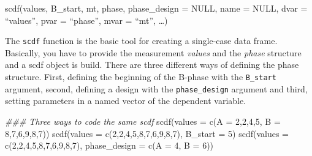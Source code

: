 \documentclass[
  letterpaper,
  DIV=11,
  numbers=noendperiod]{scrreprt}
\newenvironment{Shaded}{\begin{snugshade}}{\end{snugshade}}
\newcommand{\AttributeTok}[1]{\textcolor[rgb]{0.40,0.45,0.13}{#1}}
\newcommand{\DecValTok}[1]{\textcolor[rgb]{0.68,0.00,0.00}{#1}}
\newcommand{\DocumentationTok}[1]{\textcolor[rgb]{0.37,0.37,0.37}{\textit{#1}}}
\newcommand{\FunctionTok}[1]{\textcolor[rgb]{0.28,0.35,0.67}{#1}}
\newcommand{\NormalTok}[1]{\textcolor[rgb]{0.00,0.23,0.31}{#1}}
\begin{document}
\begin{tcolorbox}[enhanced jigsaw, toprule=.15mm, colframe=quarto-callout-tip-color-frame, left=2mm, colback=white, breakable, bottomrule=.15mm, arc=.35mm, rightrule=.15mm, leftrule=.75mm, opacityback=0]
\begin{minipage}[t]{5.5mm}
\textcolor{quarto-callout-tip-color}{\faLightbulb}
\end{minipage}%
\begin{minipage}[t]{\textwidth - 5.5mm}
scdf(values, B\_start, mt, phase, phase\_design = NULL, name = NULL,
dvar = ``values'', pvar = ``phase'', mvar = ``mt'',
\ldots)\end{minipage}%
\end{tcolorbox}

The \texttt{scdf} function is the basic tool for creating a single-case
data frame. Basically, you have to provide the measurement \emph{values}
and the \emph{phase} structure and a scdf object is build. There are
three different ways of defining the phase structure. First, defining
the beginning of the B-phase with the \texttt{B\_start} argument,
second, defining a design with the \texttt{phase\_design} argument and
third, setting parameters in a named vector of the dependent variable.

\begin{Shaded}
\begin{Highlighting}[]
\DocumentationTok{\#\#\# Three ways to code the same scdf}
\FunctionTok{scdf}\NormalTok{(}\AttributeTok{values =} \FunctionTok{c}\NormalTok{(}\AttributeTok{A =} \DecValTok{2}\NormalTok{,}\DecValTok{2}\NormalTok{,}\DecValTok{4}\NormalTok{,}\DecValTok{5}\NormalTok{, }\AttributeTok{B =} \DecValTok{8}\NormalTok{,}\DecValTok{7}\NormalTok{,}\DecValTok{6}\NormalTok{,}\DecValTok{9}\NormalTok{,}\DecValTok{8}\NormalTok{,}\DecValTok{7}\NormalTok{))}
\FunctionTok{scdf}\NormalTok{(}\AttributeTok{values =} \FunctionTok{c}\NormalTok{(}\DecValTok{2}\NormalTok{,}\DecValTok{2}\NormalTok{,}\DecValTok{4}\NormalTok{,}\DecValTok{5}\NormalTok{,}\DecValTok{8}\NormalTok{,}\DecValTok{7}\NormalTok{,}\DecValTok{6}\NormalTok{,}\DecValTok{9}\NormalTok{,}\DecValTok{8}\NormalTok{,}\DecValTok{7}\NormalTok{), }\AttributeTok{B\_start =} \DecValTok{5}\NormalTok{)}
\FunctionTok{scdf}\NormalTok{(}\AttributeTok{values =} \FunctionTok{c}\NormalTok{(}\DecValTok{2}\NormalTok{,}\DecValTok{2}\NormalTok{,}\DecValTok{4}\NormalTok{,}\DecValTok{5}\NormalTok{,}\DecValTok{8}\NormalTok{,}\DecValTok{7}\NormalTok{,}\DecValTok{6}\NormalTok{,}\DecValTok{9}\NormalTok{,}\DecValTok{8}\NormalTok{,}\DecValTok{7}\NormalTok{), }\AttributeTok{phase\_design =} \FunctionTok{c}\NormalTok{(}\AttributeTok{A =} \DecValTok{4}\NormalTok{, }\AttributeTok{B =} \DecValTok{6}\NormalTok{))}
\end{Highlighting}
\end{Shaded}
\end{document}
